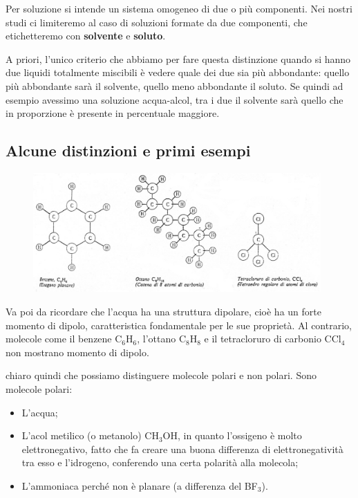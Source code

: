Per soluzione si intende un sistema omogeneo di due o più componenti. Nei nostri studi ci limiteremo al caso di soluzioni formate da due componenti, che etichetteremo con \textbf{solvente} e \textbf{soluto}.

A priori, l'unico criterio che abbiamo per fare questa distinzione quando si hanno due liquidi totalmente miscibili è vedere quale dei due sia più abbondante: quello più abbondante sarà il solvente, quello meno abbondante il soluto. Se quindi ad esempio avessimo una soluzione acqua-alcol, tra i due il solvente sarà quello che in proporzione è presente in percentuale maggiore.

\subsection{Alcune distinzioni e primi esempi}

\begin{figure}[htp]
    \centering
    \includegraphics[width=11cm]{immagini/molecole_non_polari.png}
\end{figure}

Va poi da ricordare che l'acqua ha una struttura dipolare, cioè ha un forte momento di dipolo, caratteristica fondamentale per le sue proprietà. Al contrario, molecole come il benzene C$_6$H$_6$, l'ottano C$_8$H$_8$ e il tetracloruro di carbonio CCl$_4$ non mostrano momento di dipolo.

\E chiaro quindi che possiamo distinguere molecole polari e non polari. Sono molecole polari:

\begin{itemize}
    \item L'acqua;
    \item L'acol metilico (o metanolo) CH$_3$OH, in quanto l'ossigeno è molto elettronegativo, fatto che fa creare una buona differenza di elettronegatività tra esso e l'idrogeno, conferendo una certa polarità alla molecola;
    \item L'ammoniaca perché non è planare (a differenza del BF$_3$).
\end{itemize}

